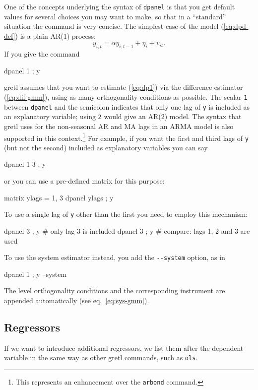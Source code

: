 One of the concepts underlying the syntax of \texttt{dpanel} is that
you get default values for several choices you may want to make, so
that in a ``standard'' situation the command is very concise.  The
simplest case of the model (\ref{eq:dpd-def}) is a plain AR(1)
process:
\begin{equation}
\label{eq:dp1}
  y_{i,t} = \alpha y_{i,t-1} + \eta_{i} + v_{it} .
\end{equation}
If you give the command
\begin{code}
  dpanel 1 ; y
\end{code}
gretl assumes that you want to estimate (\ref{eq:dp1}) via the
difference estimator (\ref{eq:dif-gmm}), using as many orthogonality
conditions as possible.  The scalar \texttt{1} between \texttt{dpanel}
and the semicolon indicates that only one lag of \texttt{y} is
included as an explanatory variable; using \texttt{2} would give an
AR(2) model. The syntax that gretl uses for the non-seasonal AR and MA
lags in an ARMA model is also supported in this context.\footnote{This
  represents an enhancement over the \texttt{arbond} command.} For
example, if you want the first and third lags of \texttt{y} (but not
the second) included as explanatory variables you can say
\begin{code}
  dpanel {1 3} ; y
\end{code}
or you can use a pre-defined matrix for this purpose:
\begin{code}
  matrix ylags = {1, 3}
  dpanel ylags ; y
\end{code}
To use a single lag of \texttt{y} other than the first you need to
employ this mechanism:
\begin{code}
  dpanel {3} ; y # only lag 3 is included
  dpanel 3 ; y   # compare: lags 1, 2 and 3 are used
\end{code}

To use the system estimator instead, you add the \verb|--system|
option, as in
\begin{code}
  dpanel 1 ; y --system
\end{code}
The level orthogonality conditions and the corresponding instrument
are appended automatically (see eq.\ \ref{eq:sys-gmm}).

\subsection{Regressors}

If we want to introduce additional regressors, we list them after the
dependent variable in the same way as other gretl commands, such as
\texttt{ols}.

